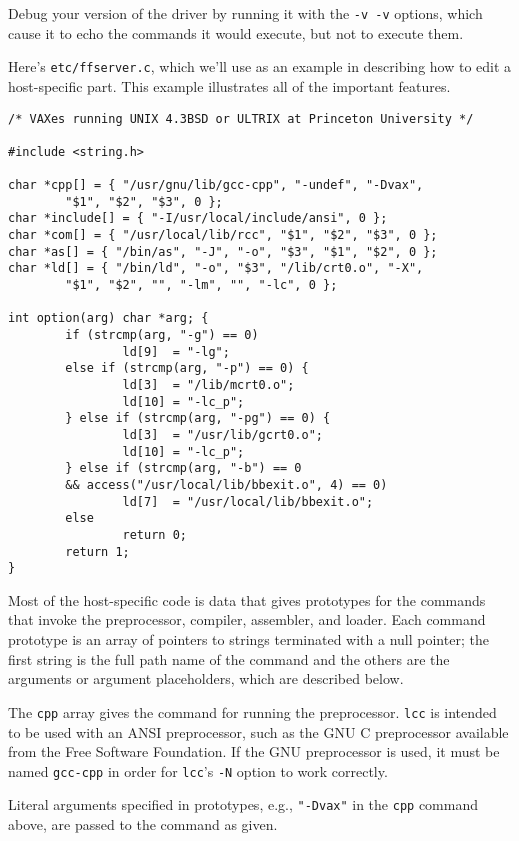 Debug your version of the driver by running it
with the \verb|-v -v| options, which cause it to echo the
commands it would execute, but not to execute them.

Here's \verb|etc/ffserver.c|, which we'll use as an example
in describing how to edit a host-specific part.
This example illustrates all of the important features.
\begin{verbatim}
/* VAXes running UNIX 4.3BSD or ULTRIX at Princeton University */

#include <string.h>

char *cpp[] = { "/usr/gnu/lib/gcc-cpp", "-undef", "-Dvax",
        "$1", "$2", "$3", 0 };
char *include[] = { "-I/usr/local/include/ansi", 0 };
char *com[] = { "/usr/local/lib/rcc", "$1", "$2", "$3", 0 };
char *as[] = { "/bin/as", "-J", "-o", "$3", "$1", "$2", 0 };
char *ld[] = { "/bin/ld", "-o", "$3", "/lib/crt0.o", "-X",
        "$1", "$2", "", "-lm", "", "-lc", 0 };

int option(arg) char *arg; {
        if (strcmp(arg, "-g") == 0)
                ld[9]  = "-lg";
        else if (strcmp(arg, "-p") == 0) {
                ld[3]  = "/lib/mcrt0.o";
                ld[10] = "-lc_p";
        } else if (strcmp(arg, "-pg") == 0) {
                ld[3]  = "/usr/lib/gcrt0.o";
                ld[10] = "-lc_p";
        } else if (strcmp(arg, "-b") == 0
        && access("/usr/local/lib/bbexit.o", 4) == 0)
                ld[7]  = "/usr/local/lib/bbexit.o";
        else
                return 0;
        return 1;
}
\end{verbatim}

Most of the host-specific code is data that
gives prototypes for the commands that invoke
the preprocessor, compiler, assembler, and loader.
Each command prototype is an array of pointers to strings
terminated with a null pointer;
the first string is the full path name of the command and the others
are the arguments or argument placeholders, which are described below.

The \verb|cpp| array gives the command for running the preprocessor.
\verb|lcc| is intended to be used with an ANSI preprocessor,
such as the GNU C preprocessor available from the Free Software Foundation.
If the GNU preprocessor is used,
it must be named \verb|gcc-cpp| in order for \verb|lcc|'s \verb|-N| option
to work correctly.

Literal arguments specified in prototypes, e.g., \verb|"-Dvax"| in
the \verb|cpp| command above, are passed to the command as given.

